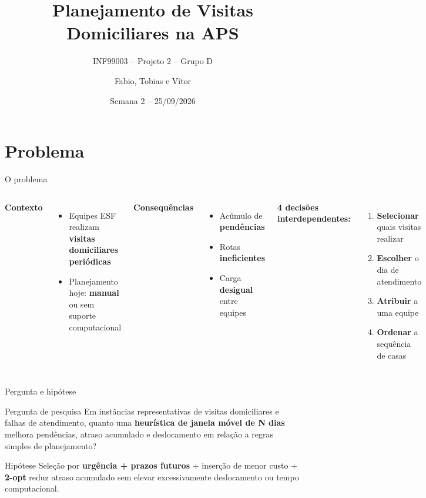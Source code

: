 \documentclass[aspectratio=169]{beamer}
\title[PHVD-APS -- Projeto de Pesquisa]{Planejamento de Visitas Domiciliares na APS\\}
\subtitle{INF99003 -- Projeto 2 -- Grupo D}
\author{Fabio, Tobias e V\'itor}
\date{Semana 2 -- 25/09/2026}
\begin{document}
\begin{frame}
  \titlepage
\end{frame}

\section{Problema}

\begin{frame}{O problema}
  \begin{columns}[T]
      \textbf{Contexto}
      \begin{itemize}
        \item Equipes ESF realizam \textbf{visitas domiciliares peri\'odicas}
        \item Planejamento hoje: \textbf{manual} ou sem suporte computacional
      \end{itemize}
      \vspace{0.4em}
      \textbf{Consequ\^encias}
      \begin{itemize}
        \item Ac\'umulo de \textbf{pend\^encias}
        \item Rotas \textbf{ineficientes}
        \item Carga \textbf{desigual} entre equipes
      \end{itemize}
      \textbf{4 decis\~oes interdependentes:}
      \vspace{0.3em}
      \begin{enumerate}
        \item \textbf{Selecionar} quais visitas realizar
        \item \textbf{Escolher} o dia de atendimento
        \item \textbf{Atribuir} a uma equipe
        \item \textbf{Ordenar} a sequ\^encia de casas
      \end{enumerate}
      \vspace{0.4em}
  \end{columns}
\end{frame}

\begin{frame}{Pergunta e hip\'otese}
  \begin{block}{Pergunta de pesquisa}
    Em inst\^ancias representativas de visitas domiciliares e falhas de
    atendimento, quanto uma \textbf{heur\'istica de janela m\'ovel de N dias}
    melhora pend\^encias, atraso acumulado e deslocamento em rela\c{c}\~ao a
    regras simples de planejamento?
  \end{block}
  \vspace{0.5em}
  \begin{alertblock}{Hip\'otese}
    Sele\c{c}\~ao por \textbf{urg\^encia + prazos futuros} + inser\c{c}\~ao de
    menor custo + \textbf{2-opt} reduz atraso acumulado sem elevar
    excessivamente deslocamento ou tempo computacional.
  \end{alertblock}
\end{frame}
\end{document}

